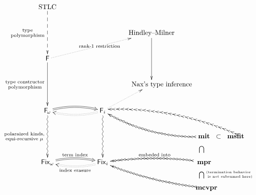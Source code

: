 \centering
$\xymatrix{
 \textrm{STLC}
     \ar@{-->}[dd]_{\begin{smallmatrix}
                      \textrm{type}\\
                      \textrm{polymorphism}
                    \end{smallmatrix}} \\
      &&& \textrm{Hindley--Milner} \ar[dd] & \\
 \F  \ar[dd]_{\begin{smallmatrix}
                \textrm{type constructor} \\
                \textrm{polymorphism}
              \end{smallmatrix}}
     \ar@{.>}[rrru]|{\textrm{rank-1 restriction}}
                &&&& \\
                 &&& \textrm{Nax's type inference\hspace{-3em}} & \\
 \Fw   \ar@/^/@{=>}[rr]
       \ar@{~>}[dd]_{\begin{smallmatrix}
                       \textrm{polaraized kinds,}\\
                       \textrm{equi-recursive } \mu
                     \end{smallmatrix}}
                && \Fi \ar@{~>}[dd] \ar@/^/@{:>}[ll] \ar@{.>}[ru] &&
             \\ &&&& ~ \MIt \;~\subset~\; \MsfIt \hspace{-4em}
                            \ar@/^1pc/@{{ }{>}{>}}[llu]
                          & \ar@<-.5ex>@/_1pc/@{{ }{>}{>}}[lllu] \\
 \Fixw \ar@/^/@{=>}[rr]^{\textrm{term index}}
                && \Fixi \ar@/^/@{:>}[ll]^{\textrm{index erasure}}
                  && ~ \MPr \quad
                             \ar@{}[u]^{\bigcap}
			     \ar@/_/@{{ }{>}{>}}[ll]_{\textrm{embeded into}} \\
                  &&&& \McvPr
                             \ar@{}[u]^{\bigcap}
                      \ar@<.5em>@{}[u]_{\begin{smallmatrix}
                                         _\textrm{(termination behavior~}\\
                                         ^\textrm{~is not subsumed here)}
                                        \end{smallmatrix}}
			     \ar@/^/@{{ }{>}{>}}[llu] \\
}$
